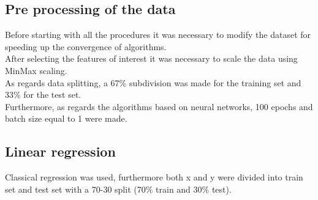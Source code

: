 \subsection{Pre processing of the data}
Before starting with all the procedures it was necessary to modify the dataset for speeding up the convergence of algorithms.
\\After selecting the features of interest it was necessary to scale the data using MinMax scaling.
\\As regards data splitting, a 67\% subdivision was made for the training set and 33\% for the test set.
\\Furthermore, as regards the algorithms based on neural networks, 100 epochs and batch size equal to 1 were made.

\subsection{Linear regression}
Classical regression was used, furthermore both x and y were divided into train set and test set with a 70-30 split (70$\%$ train and 30$\%$ test).
